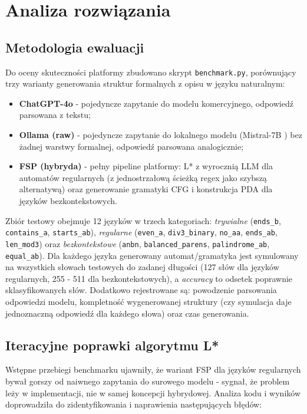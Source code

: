 \documentclass[12pt]{article}
\begin{document}
\section{Analiza rozwiązania}

\subsection{Metodologia ewaluacji}

Do oceny skuteczności platformy zbudowano skrypt \texttt{benchmark.py}, porównujący trzy warianty generowania struktur formalnych z opisu w języku naturalnym:

\begin{itemize}
    \item \textbf{ChatGPT-4o} - pojedyncze zapytanie do modelu komercyjnego, odpowiedź parsowana z tekstu;
    \item \textbf{Ollama (raw)} - pojedyncze zapytanie do lokalnego modelu (Mistral-7B \cite{jiang2023}) bez żadnej warstwy formalnej, odpowiedź parsowana analogicznie;
    \item \textbf{FSP (hybryda)} - pełny pipeline platformy: L* z wyrocznią LLM dla automatów regularnych (z jednostrzałową ścieżką regex jako szybszą alternatywą) oraz generowanie gramatyki CFG i konstrukcja PDA dla języków bezkontekstowych.
\end{itemize}

Zbiór testowy obejmuje 12 języków w trzech kategoriach: \emph{trywialne} (\texttt{ends\_b}, \texttt{contains\_a}, \texttt{starts\_ab}), \emph{regularne} (\texttt{even\_a}, \texttt{div3\_binary}, \texttt{no\_aa}, \texttt{ends\_ab}, \texttt{len\_mod3}) oraz \emph{bezkontekstowe} (\texttt{anbn}, \texttt{balanced\_parens}, \texttt{palindrome\_ab}, \texttt{equal\_ab}). Dla każdego języka generowany automat/gramatyka jest symulowany na wszystkich słowach testowych do zadanej długości (127 słów dla języków regularnych, 255 - 511 dla bezkontekstowych), a \emph{accuracy} to odsetek poprawnie sklasyfikowanych słów. Dodatkowo rejestrowane są: powodzenie parsowania odpowiedzi modelu, kompletność wygenerowanej struktury (czy symulacja daje jednoznaczną odpowiedź dla każdego słowa) oraz czas generowania.

\subsection{Iteracyjne poprawki algorytmu L*}

Wstępne przebiegi benchmarku ujawniły, że wariant FSP dla języków regularnych bywał gorszy od naiwnego zapytania do surowego modelu - sygnał, że problem leży w implementacji, nie w samej koncepcji hybrydowej. Analiza kodu i wyników doprowadziła do zidentyfikowania i naprawienia następujących błędów:
\end{document}

